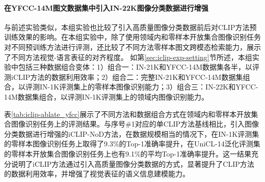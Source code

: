 \paragraph{在YFCC-14M图文数据集中引入IN-22K图像分类数据进行增强} 与前述实验类似，本组实验也比较了引入高质量图像分类数据前后对CLIP方法预训练效果的影响。在本组实验中，除了使用领域内和零样本开放集合图像识别任务对不同预训练方法进行评测，还比较了不同方法零样本图文跨模态检索能力，展示了不同方法视觉-语言表征的对齐程度。
如第\ref{sec:iclip-exp-setting}节所述，本组实验中包括三种数据组合变体：1）组合一：IN-21K和YFCC-14M数据集各半，以评测iCLIP方法的数据利用效率；2）组合二：完整IN-21K和YFCC-14M数据集组合，以评测IN-1K评测集上的零样本图像识别能力；3）组合三：IN-22K和YFCC-14M数据集组合，以评测IN-1K评测集上的领域内图像识别能力。

表\ref{tab:iclip-ablate_yfcc}展示了不同方法和数据组合方式在领域内和零样本开放集合图像识别任务上的评测结果。与序号\#1对应的单CLIP方法基线相比，引入图像分类数据进行增强的iCLIP-NoD方法，在数据规模相当的情况下，在IN-1K评测集的零样本图像识别任务上取得了9.3\%的Top-1准确率提升，在UniCL-14泛化评测集的零样本开放集合图像识别任务上也有9.1\%的平均Top-1准确率提升。这一结果充分说明了iCLIP方法通过引入高质量图像分类数据的方式，显著提升了CLIP方法的数据利用效率，并增强了视觉表征的语义信息建模能力。

